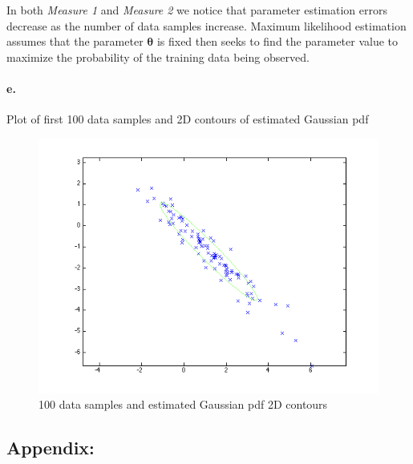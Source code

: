 \documentclass[a4paper]{article}
\begin{document}
In both \emph{Measure 1} and \emph{Measure 2} we notice that parameter estimation errors decrease as the number of data samples increase. Maximum likelihood estimation assumes that the parameter $\boldsymbol{\theta}$ is fixed then seeks to find the parameter value to maximize the probability of the training data being observed.

\paragraph{e.} Plot of first 100 data samples and 2D contours of estimated Gaussian pdf \\
\begin{figure}[H]
  \centering
    \includegraphics[scale=.44]{images/3_f_II.png}
  \caption{100 data samples and estimated Gaussian pdf 2D contours}
\end{figure}

\newpage
\subsection*{Appendix:}

\end{document}

